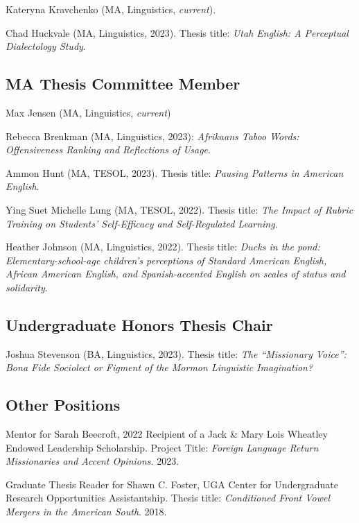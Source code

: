 \documentclass[
]{article}
\begin{document}
Kateryna Kravchenko (MA, Linguistics, \emph{current}).

Chad Huckvale (MA, Linguistics, 2023). Thesis title: \emph{Utah English:
A Perceptual Dialectology Study}.

\hypertarget{ma-thesis-committee-member}{%
\subsection{MA Thesis Committee
Member}\label{ma-thesis-committee-member}}

Max Jensen (MA, Linguistics, \emph{current})

Rebecca Brenkman (MA, Linguistics, 2023): \emph{Afrikaans Taboo Words:
Offensiveness Ranking and Reflections of Usage}.

Ammon Hunt (MA, TESOL, 2023). Thesis title: \emph{Pausing Patterns in
American English}.

Ying Suet Michelle Lung (MA, TESOL, 2022). Thesis title: \emph{The
Impact of Rubric Training on Students' Self-Efficacy and Self-Regulated
Learning}.

Heather Johnson (MA, Linguistics, 2022). Thesis title: \emph{Ducks in
the pond: Elementary-school-age children's perceptions of Standard
American English, African American English, and Spanish-accented English
on scales of status and solidarity}.

\hypertarget{undergraduate-honors-thesis-chair}{%
\subsection{Undergraduate Honors Thesis
Chair}\label{undergraduate-honors-thesis-chair}}

Joshua Stevenson (BA, Linguistics, 2023). Thesis title: \emph{The
``Missionary Voice'': Bona Fide Sociolect or Figment of the Mormon
Linguistic Imagination?}

\hypertarget{other-positions}{%
\subsection{Other Positions}\label{other-positions}}

Mentor for Sarah Beecroft, 2022 Recipient of a Jack \& Mary Lois
Wheatley Endowed Leadership Scholarship. Project Title: \emph{Foreign
Language Return Missionaries and Accent Opinions}. 2023.

Graduate Thesis Reader for Shawn C. Foster, UGA Center for Undergraduate
Research Opportunities Assistantship. Thesis title: \emph{Conditioned
Front Vowel Mergers in the American South}. 2018.
\end{document}
